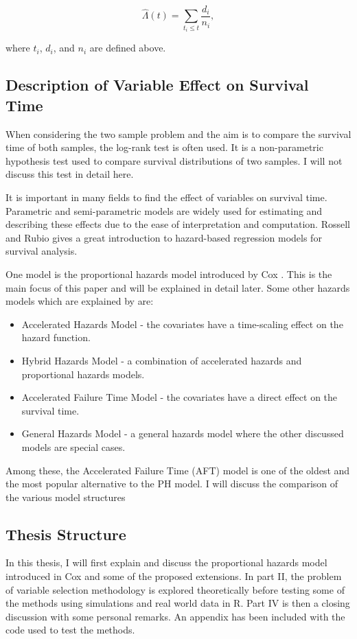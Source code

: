 \begin{equation}\label{nelson-aalen-estimator-eqn}
    \hat{\Lambda}(t)=\sum_{t_i\leq t}\frac{d_i}{n_i},
\end{equation}

where $t_i$, $d_i$, and $n_i$ are defined above.

\subsection{Description of Variable Effect on Survival Time}

When considering the two sample problem and the aim is to compare the survival time of both samples, the log-rank test is often used. It is a non-parametric hypothesis test used to compare survival distributions of two samples. I will not discuss this test in detail here.

It is important in many fields to find the effect of variables on survival time. Parametric and semi-parametric models are widely used for estimating and describing these effects due to the ease of interpretation and computation. Rossell and Rubio  gives a great introduction to hazard-based regression models for survival analysis. 

One model is the proportional hazards model introduced by Cox . This is the main focus of this paper and will be explained in detail later. Some other hazards models which are explained by \cite{rossellrubio} are:
\begin{itemize}
    \item Accelerated Hazards Model - the covariates have a time-scaling effect on the hazard function.
    \item Hybrid Hazards Model - a combination of accelerated hazards and proportional hazards models.
    \item Accelerated Failure Time Model - the covariates have a direct effect on the survival time.
    \item General Hazards Model - a general hazards model where the other discussed models are special cases.
\end{itemize}

Among these, the Accelerated Failure Time (AFT) model is one of the oldest and the most popular alternative to the PH model. I will discuss the comparison of the various model structures %

\subsection{Thesis Structure}

In this thesis, I will first explain and discuss the proportional hazards model introduced in Cox  and some of the proposed extensions. In part II, the problem of variable selection methodology is explored theoretically before testing some of the methods using simulations and real world data in R. Part IV is then a closing discussion with some personal remarks. An appendix has been included with the code used to test the methods.